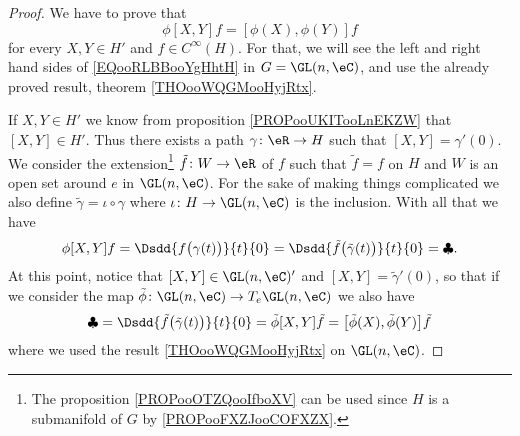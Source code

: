 \begin{proof}
    We have to prove that
    \begin{equation}        \label{EQooRLBBooYgHhtH}
        \phi[X,Y]f=[\phi(X),\phi(Y)]f
    \end{equation}
    for every \( X,Y\in H'\) and \( f\in  C^{\infty}(H)\). For that, we will see the left and right hand sides of \eqref{EQooRLBBooYgHhtH} in \( G=\GL(n,\eC)\), and use the already proved result, theorem \ref{THOooWQGMooHyjRtx}.

    If \( X,Y\in H'\) we know from proposition \ref{PROPooUKITooLnEKZW} that \( [X,Y]\in H'\). Thus there exists a path \( \gamma\colon \eR\to H\) such that \( [X,Y]=\gamma'(0)\). We consider the extension\footnote{The proposition \ref{PROPooOTZQooIfboXV} can be used since \( H\) is a submanifold of \( G\) by \ref{PROPooFXZJooCOFXZX}.} \( \tilde f\colon W\to \eR\) of \( f\) such that \( \tilde f=f\) on \( H\) and \( W\) is an open set around \( e\) in \( \GL(n,\eC)\). For the sake of making things complicated we also define \( \tilde \gamma=\iota\circ \gamma\) where \( \iota\colon H\to \GL(n,\eC)\) is the inclusion. With all that we have
    \begin{equation}
        \phi[X,Y]f=\Dsdd{ f\big( \gamma(t) \big) }{t}{0}=\Dsdd{ \tilde f\big( \tilde \gamma(t) \big) }{t}{0}=\clubsuit.
    \end{equation}
    At this point, notice that \( [X,Y]\in \GL(n,\eC)'\) and \( [X,Y]=\tilde \gamma'(0)\), so that if we consider the map \( \tilde \phi\colon \GL(n,\eC)\to T_e\GL(n,\eC)\) we also have
    \begin{equation}
        \clubsuit=\Dsdd{ \tilde f\big( \tilde \gamma(t) \big) }{t}{0}=\tilde \phi[X,Y]\tilde f=\big[ \tilde \phi(X),\tilde \phi(Y) \big]\tilde f
    \end{equation}
    where we used the result \ref{THOooWQGMooHyjRtx} on \( \GL(n,\eC)\).


\end{proof}
